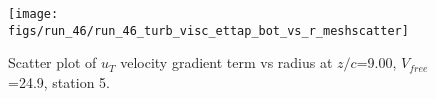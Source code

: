 \begin{figure}[H]
\centering
\texttt{[image: figs/run\_46/run\_46\_turb\_visc\_ettap\_bot\_vs\_r\_meshscatter]}
\caption{Scatter plot of $
u_T$ velocity gradient term vs radius at $z/c$=9.00, $V_{free}$=24.9, station 5.}
\end{figure}


